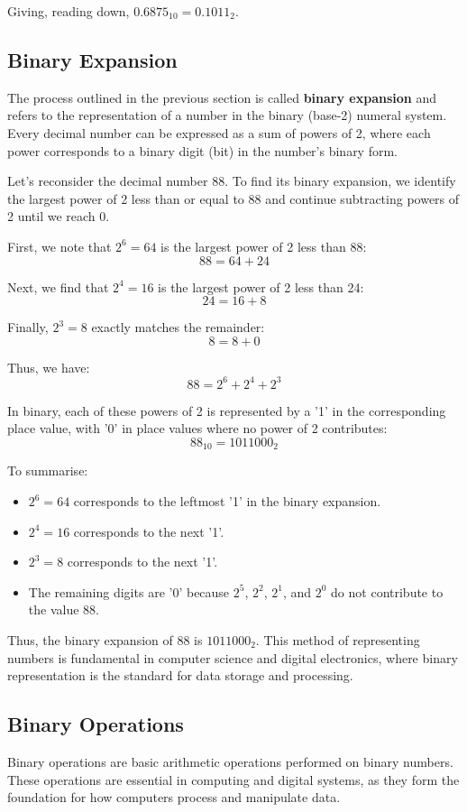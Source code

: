 Giving, reading down, $0.6875_{10} = 0.1011_2$.

\subsection*{Binary Expansion}

The process outlined in the previous section is called \textbf{binary expansion} and refers to the representation of a number in the binary (base-2) numeral system. Every decimal number can be expressed as a sum of powers of 2, where each power corresponds to a binary digit (bit) in the number's binary form.

Let's reconsider the decimal number 88. To find its binary expansion, we identify the largest power of 2 less than or equal to 88 and continue subtracting powers of 2 until we reach 0.

First, we note that $2^6 = 64$ is the largest power of 2 less than 88:
\[
88 = 64 + 24
\]

Next, we find that $2^4 = 16$ is the largest power of 2 less than 24:
\[
24 = 16 + 8
\]

Finally, $2^3 = 8$ exactly matches the remainder:
\[
8 = 8 + 0
\]

Thus, we have:
\[
88 = 2^6 + 2^4 + 2^3
\]

In binary, each of these powers of 2 is represented by a '1' in the corresponding place value, with '0' in place values where no power of 2 contributes:
\[
88_{10} = 1011000_2
\]

To summarise:
\begin{itemize}
    \item $2^6 = 64$ corresponds to the leftmost '1' in the binary expansion.
    \item $2^4 = 16$ corresponds to the next '1'.
    \item $2^3 = 8$ corresponds to the next '1'.
    \item The remaining digits are '0' because $2^5$, $2^2$, $2^1$, and $2^0$ do not contribute to the value 88.
\end{itemize}

Thus, the binary expansion of 88 is $1011000_2$. This method of representing numbers is fundamental in computer science and digital electronics, where binary representation is the standard for data storage and processing.

\subsection*{Binary Operations}
Binary operations are basic arithmetic operations performed on binary numbers. These operations are essential in computing and digital systems, as they form the foundation for how computers process and manipulate data.

